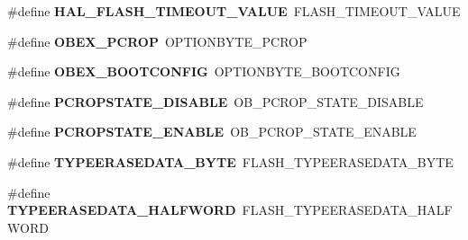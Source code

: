 \begin{DoxyCompactItemize}
\mbox{\label{group___h_a_l___f_l_a_s_h___aliased___defines_ga0c295495be438d4092e29488ac3ee897}} 
\#define {\bfseries H\+A\+L\+\_\+\+F\+L\+A\+S\+H\+\_\+\+T\+I\+M\+E\+O\+U\+T\+\_\+\+V\+A\+L\+UE}~F\+L\+A\+S\+H\+\_\+\+T\+I\+M\+E\+O\+U\+T\+\_\+\+V\+A\+L\+UE
\item 
\mbox{\label{group___h_a_l___f_l_a_s_h___aliased___defines_ga1de788f8cf04b70320aaebf3388e638c}} 
\#define {\bfseries O\+B\+E\+X\+\_\+\+P\+C\+R\+OP}~O\+P\+T\+I\+O\+N\+B\+Y\+T\+E\+\_\+\+P\+C\+R\+OP
\item 
\mbox{\label{group___h_a_l___f_l_a_s_h___aliased___defines_ga79284d41c929869394172fc526ff3d7e}} 
\#define {\bfseries O\+B\+E\+X\+\_\+\+B\+O\+O\+T\+C\+O\+N\+F\+IG}~O\+P\+T\+I\+O\+N\+B\+Y\+T\+E\+\_\+\+B\+O\+O\+T\+C\+O\+N\+F\+IG
\item 
\mbox{\label{group___h_a_l___f_l_a_s_h___aliased___defines_ga09f7800119c1971e339df62f11beab14}} 
\#define {\bfseries P\+C\+R\+O\+P\+S\+T\+A\+T\+E\+\_\+\+D\+I\+S\+A\+B\+LE}~O\+B\+\_\+\+P\+C\+R\+O\+P\+\_\+\+S\+T\+A\+T\+E\+\_\+\+D\+I\+S\+A\+B\+LE
\item 
\mbox{\label{group___h_a_l___f_l_a_s_h___aliased___defines_ga9e086afe58f178c3e86526666bedc217}} 
\#define {\bfseries P\+C\+R\+O\+P\+S\+T\+A\+T\+E\+\_\+\+E\+N\+A\+B\+LE}~O\+B\+\_\+\+P\+C\+R\+O\+P\+\_\+\+S\+T\+A\+T\+E\+\_\+\+E\+N\+A\+B\+LE
\item 
\mbox{\label{group___h_a_l___f_l_a_s_h___aliased___defines_ga4b3d9b5629b76e57da896b4b7f95d3d7}} 
\#define {\bfseries T\+Y\+P\+E\+E\+R\+A\+S\+E\+D\+A\+T\+A\+\_\+\+B\+Y\+TE}~F\+L\+A\+S\+H\+\_\+\+T\+Y\+P\+E\+E\+R\+A\+S\+E\+D\+A\+T\+A\+\_\+\+B\+Y\+TE
\item 
\mbox{\label{group___h_a_l___f_l_a_s_h___aliased___defines_gaaad85877529e61a7d77a294a9cf2d474}} 
\#define {\bfseries T\+Y\+P\+E\+E\+R\+A\+S\+E\+D\+A\+T\+A\+\_\+\+H\+A\+L\+F\+W\+O\+RD}~F\+L\+A\+S\+H\+\_\+\+T\+Y\+P\+E\+E\+R\+A\+S\+E\+D\+A\+T\+A\+\_\+\+H\+A\+L\+F\+W\+O\+RD

\end{DoxyCompactItemize}
